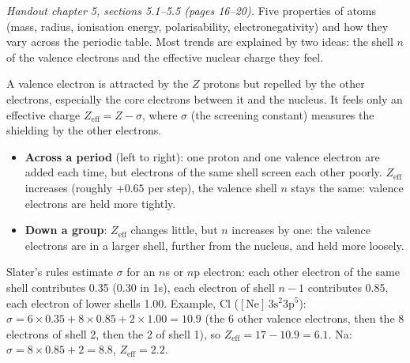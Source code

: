 
\textit{Handout chapter 5, sections 5.1--5.5 (pages 16--20).} Five properties of atoms (mass, radius,
ionisation energy, polarisability, electronegativity) and how they vary across the periodic table. Most
trends are explained by two ideas: the shell $n$ of the valence electrons and the effective nuclear
charge they feel.


\begin{concept}
A valence electron is attracted by the $Z$ protons but repelled by the other electrons, especially the
core electrons between it and the nucleus. It feels only an effective charge
$Z_\mathrm{eff} = Z - \sigma$, where $\sigma$ (the screening constant) measures the shielding by the
other electrons.
\end{concept}
\begin{itemize}
  \item \textbf{Across a period} (left to right): one proton and one valence electron are added each
        time, but electrons of the same shell screen each other poorly. $Z_\mathrm{eff}$ increases
        (roughly $+0.65$ per step), the valence shell $n$ stays the same: valence electrons are held more
        tightly.
  \item \textbf{Down a group}: $Z_\mathrm{eff}$ changes little, but $n$ increases by one: the valence
        electrons are in a larger shell, further from the nucleus, and held more loosely.
\end{itemize}
\begin{going}
Slater's rules estimate $\sigma$ for an $n$s or $n$p electron: each other electron of the same shell
contributes 0.35 (0.30 in 1s), each electron of shell $n-1$ contributes 0.85, each electron of lower
shells 1.00. Example, Cl ($[\mathrm{Ne}]\,3\mathrm s^2 3\mathrm p^5$): $\sigma = 6\times0.35 + 8\times0.85 +
2\times1.00 = 10.9$ (the 6 other valence electrons, then the 8 electrons of shell 2, then the 2 of shell 1),
so $Z_\mathrm{eff} = 17 - 10.9 = 6.1$. Na: $\sigma = 8\times0.85 + 2 = 8.8$, $Z_\mathrm{eff} = 2.2$.
\end{going}

